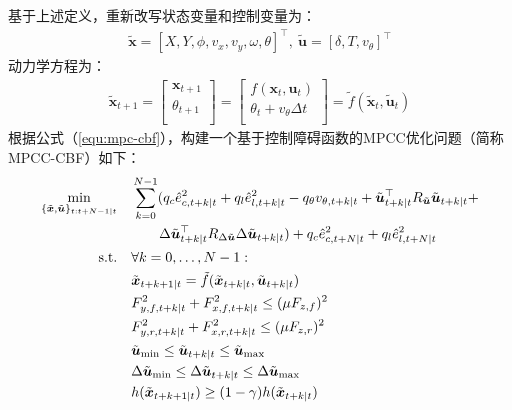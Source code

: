 基于上述定义，重新改写状态变量和控制变量为：
\begin{equation}
\begin{aligned}
    \tilde{\boldsymbol{x}} = [X, Y, \phi, v_x, v_y, \omega, \theta]^\top, \ \tilde{\boldsymbol{u}} = [\delta, T, v_{\theta}]^\top
\end{aligned}
\end{equation}
动力学方程为：
\begin{equation}
\begin{aligned}
    \tilde{\boldsymbol{x}}_{t+1} =\left[ \begin{matrix}
            \boldsymbol{x}_{t+1}  \\
            \theta_{t+1}  \\
        \end{matrix} \right] = \left[ \begin{matrix}
            f(\boldsymbol{x}_t, \boldsymbol{u}_t)  \\
            \theta_t + v_{\theta} \Delta t  \\
        \end{matrix} \right] = \tilde{f}(\tilde{\boldsymbol{x}}_t, \tilde{\boldsymbol{u}}_t)
\end{aligned}
\end{equation}
根据公式（\ref{equ:mpc-cbf}），构建一个基于控制障碍函数的MPCC优化问题（简称MPCC-CBF）如下：
{
    \allowdisplaybreaks
\begin{subequations}
\begin{align}
    \min_{\{\tilde{\boldsymbol{x}}, \tilde{\boldsymbol{u}}\}_{t:t+N-1|t}}\quad & \sum_{k=0}^{N-1} (q_c\hat{e}_{c,t+k|t}^2 + q_l\hat{e}_{l,t+k|t}^2 - q_{\theta} v_{\theta,t+k|t} + \tilde{\boldsymbol{u}}_{t+k|t}^\top R_{\tilde{\boldsymbol{u}}} \tilde{\boldsymbol{u}}_{t+k|t} + \notag\\
    & \qquad \Delta\tilde{\boldsymbol{u}}_{t+k|t}^\top R_{\Delta \tilde{\boldsymbol{u}}} \Delta\tilde{\boldsymbol{u}}_{t+k|t}) + q_c\hat{e}_{c,t+N|t}^2 + q_l\hat{e}_{l,t+N|t}^2 \\
    \text{s.t.}\quad &\forall k=0,\ldots,N-1: \notag \\
    & \tilde{\boldsymbol{x}}_{t+k+1|t} = \tilde{f}(\tilde{\boldsymbol{x}}_{t+k|t}, \tilde{\boldsymbol{u}}_{t+k|t})\\
    & F_{y,f,t+k|t}^2 + F_{x,f,t+k|t}^2 \leq (\mu F_{z,f})^2\\ \label{equ:friction1-constraint}
    & F_{y,r,t+k|t}^2 + F_{x,r,t+k|t}^2 \leq (\mu F_{z,r})^2\\ \label{equ:friction2-constraint}
    & \tilde{\boldsymbol{u}}_{\text{min}} \leq \tilde{\boldsymbol{u}}_{t+k|t} \leq \tilde{\boldsymbol{u}}_{\text{max}}\\
    & \Delta\tilde{\boldsymbol{u}}_{\text{min}} \leq \Delta\tilde{\boldsymbol{u}}_{t+k|t} \leq \Delta\tilde{\boldsymbol{u}}_{\text{max}}\\
    & h(\tilde{\boldsymbol{x}}_{t+k+1|t}) \geq (1-\gamma)h(\tilde{\boldsymbol{x}}_{t+k|t})\label{equ:mpcc-cbf-constraint}
\end{align}
\label{equ:mpcc-cbf}
\end{subequations}
}
